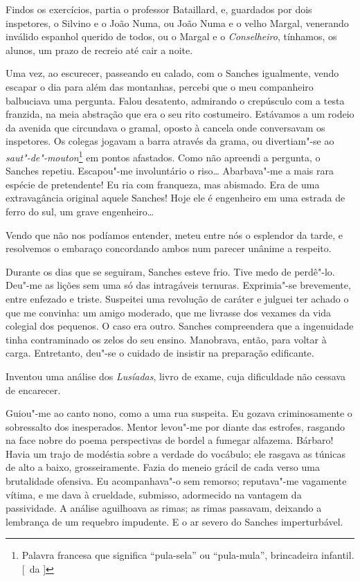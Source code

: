 Findos os exercícios, partia o professor
Bataillard, e, guardados por dois inspetores, o Silvino e o João Numa,
ou João Numa e o velho Margal, venerando inválido espanhol querido de
todos, ou o Margal e o \textit{Conselheiro}, tínhamos, os alunos, um prazo de
recreio até cair a noite. 

Uma vez, ao escurecer, passeando eu calado,
com o Sanches igualmente, vendo escapar o dia para além das montanhas,
percebi que o meu companheiro balbuciava uma pergunta. Falou desatento,
admirando o crepúsculo com a testa franzida, na meia abstração que era
o seu rito costumeiro. Estávamos a um rodeio da avenida que circundava
o gramal, oposto à cancela onde conversavam os inspetores. Os colegas
jogavam a barra através da grama, ou divertiam"-se ao
\textit{saut"-de"-mouton}\footnote{ Palavra francesa que significa 
``pula-sela'' ou ``pula-mula'', brincadeira infantil. [~da ]} 
em pontos afastados. Como não apreendi a pergunta, o
Sanches repetiu. Escapou"-me involuntário o riso\ldots{} Abarbava"-me a
mais rara espécie de pretendente! Eu ria com franqueza, mas abismado.
Era de uma extravagância original aquele Sanches! Hoje ele é engenheiro
em uma estrada de ferro do sul, um grave engenheiro\ldots{} 

Vendo que não nos podíamos entender, meteu entre nós o esplendor da tarde, e
resolvemos o embaraço concordando ambos num parecer unânime a respeito.

Durante os dias que se seguiram, Sanches esteve frio. Tive medo de
perdê"-lo. Deu"-me as lições sem uma só das intragáveis ternuras.
Exprimia"-se brevemente, entre enfezado e triste. Suspeitei uma
revolução de caráter e julguei ter achado o que me convinha: um amigo
moderado, que me livrasse dos vexames da vida colegial dos pequenos. O
caso era outro. Sanches compreendera que a ingenuidade tinha
contraminado os zelos do seu ensino. Manobrava, então, para voltar à
carga. Entretanto, deu"-se o cuidado de insistir na preparação
edificante. 

Inventou uma análise dos \textit{Lusíadas}, livro de exame, cuja
dificuldade não cessava de encarecer. 

Guiou"-me ao canto nono, como a
uma rua suspeita. Eu gozava criminosamente o sobressalto dos
inesperados. Mentor levou"-me por diante das estrofes, rasgando na
face nobre do poema perspectivas de bordel a fumegar alfazema. Bárbaro!
Havia um trajo de modéstia sobre a verdade do vocábulo; ele rasgava as
túnicas de alto a baixo, grosseiramente. Fazia do meneio grácil de cada
verso uma brutalidade ofensiva. Eu acompanhava"-o sem remorso;
reputava"-me vagamente vítima, e me dava à crueldade, submisso,
adormecido na vantagem da passividade. A análise aguilhoava as rimas;
as rimas passavam, deixando a lembrança de um requebro impudente. E o
ar severo do Sanches imperturbável. 

